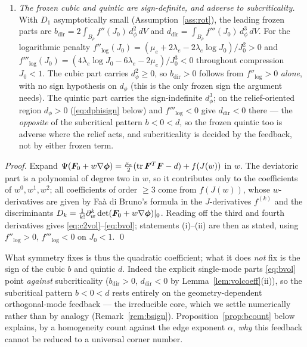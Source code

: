 \begin{lemma}
\begin{enumerate}
              the term $6f'D_3$ is moreover identically zero, since $D_k=0$ for $k>d$; the parity argument is what
              disposes of it in $d\ge3$.) This \emph{proves} the vanishing-quadratic clause of
              Assumption~\ref{ass:subcrit}.
        \item[\textup{(ii)}] \emph{The frozen cubic and quintic are sign-definite, and adverse to subcriticality.} With
              $D_1$ asymptotically small (Assumption~\ref{ass:rot}), the leading frozen
              parts are $b_{\mathrm{dir}}=2\int_{B_\rho} f''(J_0)\,d_\phi^2\,dV$ and
              $d_{\mathrm{dir}}=\int_{B_\rho} f'''(J_0)\,d_\phi^3\,dV$. For the logarithmic penalty
              $f''_{\log}(J_0)=(\mu_e+2\lambda_e-2\lambda_e\log J_0)/J_0^2>0$ and
              $f'''_{\log}(J_0)=(4\lambda_e\log J_0-6\lambda_e-2\mu_e)/J_0^3<0$ throughout compression $J_0<1$. The cubic
              part carries $d_\phi^2\ge0$, so $b_{\mathrm{dir}}>0$ follows from $f''_{\log}>0$ \emph{alone}, with no sign
              hypothesis on $d_\phi$ (this is the only frozen sign the argument needs). The quintic part carries the
              sign-indefinite $d_\phi^3$; on the relief-oriented region $d_\phi>0$ (\eqref{eq:dphisign} below) and
              $f'''_{\log}<0$ give $d_{\mathrm{dir}}<0$ there --- the \emph{opposite} of the subcritical pattern $b<0<d$, so
              the frozen quintic too is adverse where the relief acts, and subcriticality is decided by the feedback, not
              by either frozen term.
    \end{enumerate}
\end{lemma}
\begin{proof}
    Expand $\Psi(\bm F_0+w\nabla\bm\phi)=\tfrac{\mu_e}2(\operatorname{tr}\bm F^T\bm F-d)+f(J(w))$ in $w$. The deviatoric part is a
    polynomial of degree two in $w$, so it contributes only to the coefficients of $w^0,w^1,w^2$; all coefficients of
    order $\ge3$ come from $f(J(w))$, whose $w$-derivatives are given by Fa\`a di Bruno's formula in the
    $J$-derivatives $f^{(k)}$ and the discriminants $D_k=\tfrac1{k!}\partial_w^k\det(\bm F_0+w\nabla\bm\phi)|_0$. Reading
    off the third and fourth derivatives gives \eqref{eq:c2vol}--\eqref{eq:bvol}; statements (i)--(ii) are then as
    stated, using $f''_{\log}>0$, $f'''_{\log}<0$ on $J_0<1$. \qed
\end{proof}

What symmetry fixes is thus the quadratic coefficient; what it does \emph{not} fix is the sign of the cubic $b$ and
quintic $d$. Indeed the explicit single-mode parts \eqref{eq:bvol} point \emph{against} subcriticality
($b_{\mathrm{dir}}>0$, $d_{\mathrm{dir}}<0$ by Lemma~\ref{lem:volcoeff}(ii)), so the subcritical pattern $b<0<d$ rests
entirely on the geometry-dependent orthogonal-mode feedback --- the irreducible core, which we settle numerically
rather than by analogy (Remark~\ref{rem:bsign}). Proposition~\ref{prop:bcount} below explains, by a homogeneity count
against the edge exponent $\alpha$, \emph{why} this feedback cannot be reduced to a universal corner number.

